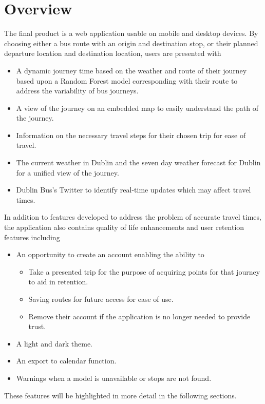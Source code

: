 \documentclass[]{UCD_CS_47360_Report}
\begin{document}
\section{Overview}
The final product is a web application usable on mobile and desktop devices. By choosing either a bus route with an origin and destination stop, or their planned departure location and destination location, users are presented with
\begin{itemize}
    \item A dynamic journey time based on the weather and route of their journey based upon a Random Forest model corresponding with their route to address the variability of bus journeys.
    \item A view of the journey on an embedded map to easily understand the path of the journey.
    \item Information on the necessary travel steps for their chosen trip for ease of travel.
    \item The current weather in Dublin and the seven day weather forecast for Dublin for a unified view of the journey.
    \item Dublin Bus's Twitter to identify real-time updates which may affect travel times.
\end{itemize} 
In addition to features developed to address the problem of accurate travel times, the application also contains quality of life enhancements and user retention features including
\begin{itemize}
    \item An opportunity to create an account enabling the ability to
    \begin{itemize}
        \item Take a presented trip for the purpose of acquiring points for that journey to aid in retention. 
        \item Saving routes for future access for ease of use.
        \item Remove their account if the application is no longer needed to provide trust.
    \end{itemize}
    \item A light and dark theme.
    \item An export to calendar function.
    \item Warnings when a model is unavailable or stops are not found.
\end{itemize} 
These features will be highlighted in more detail in the following sections.
\end{document}

